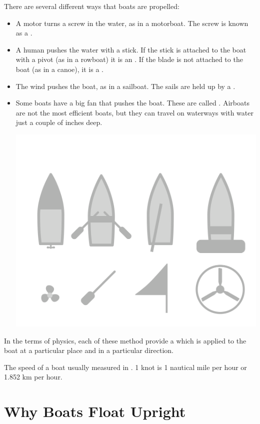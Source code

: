 There are several different ways that boats are propelled:

\begin{itemize}


\item A motor turns a screw in the water, as in a motorboat. The screw is known as a .

\item A human pushes the water with a stick.  If the stick is attached to the boat with a pivot (as in a rowboat) it is an .  If the blade is not attached to the boat (as in a canoe), it is a .

\item The wind pushes the boat,  as in a sailboat.  The sails are held up by a .

\item Some boats have a big fan that pushes the boat.  These are called .   Airboats are not the most efficient boats,  but they can travel
on waterways with water just a couple of inches deep.

\includegraphics[width=.75\textwidth]{boatTypes.png}


\end{itemize}

In the terms of physics,  each of these method provide a  which is applied to the boat at a particular place and in a particular direction.

The speed of a boat usually measured in .  1 knot is 1 nautical mile per hour or 1.852 km per hour.

\section{Why Boats Float Upright}

